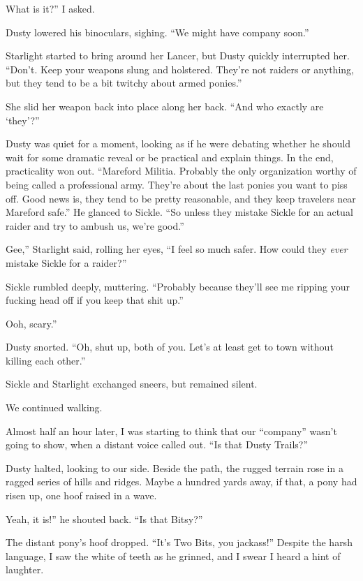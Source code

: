 \leavevmode{}What is it?” I asked.

Dusty lowered his binoculars, sighing. “We might have company soon.”

Starlight started to bring around her Lancer, but Dusty quickly interrupted her. “Don’t. Keep your weapons slung and holstered. They’re not raiders or anything, but they tend to be a bit twitchy about armed ponies.”

She slid her weapon back into place along her back. “And who exactly are ‘they’?”

Dusty was quiet for a moment, looking as if he were debating whether he should wait for some dramatic reveal or be practical and explain things. In the end, practicality won out. “Mareford Militia. Probably the only organization worthy of being called a professional army. They’re about the last ponies you want to piss off. Good news is, they tend to be pretty reasonable, and they keep travelers near Mareford safe.” He glanced to Sickle. “So unless they mistake Sickle for an actual raider and try to ambush us, we’re good.”

\leavevmode{}Gee,” Starlight said, rolling her eyes, “I feel so much safer. How could they \textit{ever} mistake Sickle for a raider?”

Sickle rumbled deeply, muttering. “Probably because they’ll see me ripping your fucking head off if you keep that shit up.”

\leavevmode{}Ooh, scary.”

Dusty snorted. “Oh, shut up, both of you. Let’s at least get to town without killing each other.”

Sickle and Starlight exchanged sneers, but remained silent.

We continued walking.

Almost half an hour later, I was starting to think that our “company” wasn’t going to show, when a distant voice called out. “Is that Dusty Trails?”

Dusty halted, looking to our side. Beside the path, the rugged terrain rose in a ragged series of hills and ridges. Maybe a hundred yards away, if that, a pony had risen up, one hoof raised in a wave.

\leavevmode{}Yeah, it is!” he shouted back. “Is that Bitsy?”

The distant pony’s hoof dropped. “It’s Two Bits, you jackass!” Despite the harsh language, I saw the white of teeth as he grinned, and I swear I heard a hint of laughter.

